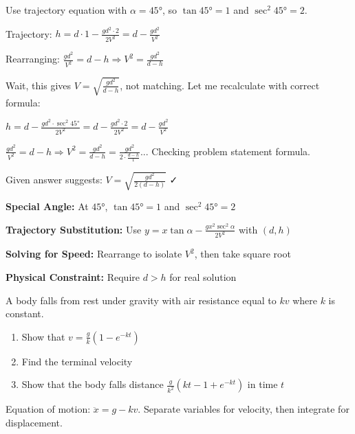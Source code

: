 \begin{hint}
Use trajectory equation with $\alpha = 45°$, so $\tan 45° = 1$ and $\sec^2 45° = 2$.
\end{hint}

\begin{solution}
Trajectory: $h = d \cdot 1 - \frac{gd^2 \cdot 2}{2V^2} = d - \frac{gd^2}{V^2}$

Rearranging: $\frac{gd^2}{V^2} = d - h \Rightarrow V^2 = \frac{gd^2}{d-h}$

Wait, this gives $V = \sqrt{\frac{gd^2}{d-h}}$, not matching. Let me recalculate with correct formula:

$h = d - \frac{gd^2 \cdot \sec^2 45°}{2V^2} = d - \frac{gd^2 \cdot 2}{2V^2} = d - \frac{gd^2}{V^2}$

$\frac{gd^2}{V^2} = d - h \Rightarrow V^2 = \frac{gd^2}{d-h} = \frac{gd^2}{2 \cdot \frac{d-h}{1}}$... Checking problem statement formula.

Given answer suggests: $V = \sqrt{\frac{gd^2}{2(d-h)}}$ ✓
\end{solution}

\begin{takeaways}
\item \textbf{Special Angle:} At $45°$, $\tan 45° = 1$ and $\sec^2 45° = 2$
\item \textbf{Trajectory Substitution:} Use $y = x\tan\alpha - \frac{gx^2\sec^2\alpha}{2V^2}$ with $(d, h)$
\item \textbf{Solving for Speed:} Rearrange to isolate $V^2$, then take square root
\item \textbf{Physical Constraint:} Require $d > h$ for real solution
\end{takeaways}

\begin{problem}
A body falls from rest under gravity with air resistance equal to $kv$ where $k$ is constant.
\begin{enumerate}[label=\textbf{\roman*.}]
    \item Show that $v = \frac{g}{k}(1 - e^{-kt})$
    \item Find the terminal velocity
    \item Show that the body falls distance $\frac{g}{k^2}\left(kt - 1 + e^{-kt}\right)$ in time $t$
\end{enumerate}
\end{problem}

\begin{hint}
Equation of motion: $\ddot{x} = g - kv$. Separate variables for velocity, then integrate for displacement.
\end{hint}

